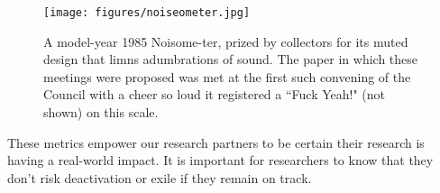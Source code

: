 \begin{figure}
  \centering
  \texttt{[image: figures/noiseometer.jpg]}
  \caption{A model-year 1985 Noisome-ter, prized by collectors for its muted design that limns adumbrations of sound. The paper in which these meetings were proposed was met at the first such convening of the Council with a cheer so loud it registered a ``Fuck Yeah!" (not shown) on this scale.}
  \label{fig:noiseometer}
\end{figure}


These metrics empower our research partners to be certain their research is having a real-world impact.  It is important for researchers to know that they don't risk deactivation or exile if they remain on track.
